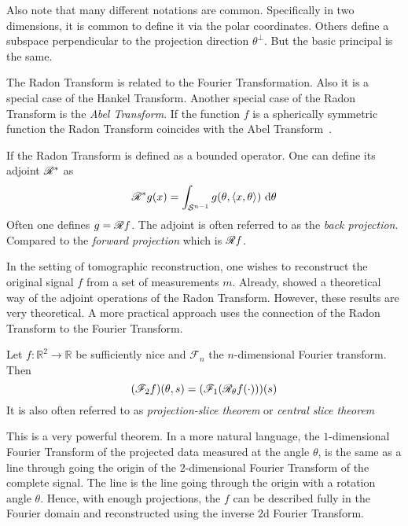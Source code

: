 Also note that many different notations are common. Specifically in two dimensions, it is common to
define it via the polar coordinates. Others define a subspace perpendicular to the projection
direction \(\theta^\perp\). But the basic principal is the same.

The Radon Transform is related to the Fourier Transformation. Also it is a special case of the
Hankel Transform. Another special case of the Radon Transform is the \textit{Abel Transform}. If the
function \(f\) is a spherically symmetric function the Radon Transform coincides with the Abel
Transform~\cite{buzug_computed_2008}.

\begin{definition}\label{def:back_projection}
	If the Radon Transform is defined as a bounded operator. One can define its adjoint
	\(\mathscr{R}^\ast\) as
	\[ \mathscr{R}^\ast g (x) = \int_{\mathcal{S}^{n-1}} g(\theta, \langle x, \theta \rangle) \, \, \mathrm{d} \theta \]
	Often one defines \(g = \mathscr{R} f\). The adjoint is often referred to as the \textit{back
		projection}. Compared to the \textit{forward projection} which is \(\mathscr{R} f\).
\end{definition}


In the setting of tomographic reconstruction, one wishes to reconstruct the original signal \(f\)
from a set of measurements \(m\). Already, \citeauthor*{radon_uber_1917} showed a theoretical way of
the adjoint operations of the Radon Transform. However, these results are very theoretical. A more
practical approach uses the connection of the Radon Transform to the Fourier Transform.

\begin{definition}\label{def:fourier_slice_theorem}
	Let \(f\colon \mathbb{R}^2 \to \mathbb{R}\) be sufficiently nice and \(\mathscr{F}_n\) the
	\(n\)-dimensional Fourier transform. Then
	\[ (\mathscr{F}_2f)(\theta, s) = (\mathscr{F}_1(\mathscr{R}_\theta f(\cdot)))(s) \]
	It is also often referred to as \textit{projection-slice theorem} or \textit{central slice theorem}
\end{definition}

This is a very powerful theorem. In a more natural language, the \(1\)-dimensional Fourier Transform
of the projected data measured at the angle \(\theta\), is the same as a line through going the
origin of the \(2\)-dimensional Fourier Transform of the complete signal. The line is the line going
through the origin with a rotation angle \(\theta\). Hence, with enough projections, the \(f\) can be
described fully in the Fourier domain and reconstructed using the inverse \(2\)d Fourier Transform.

